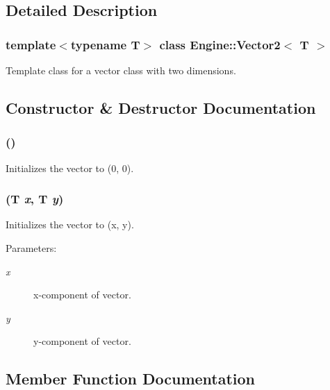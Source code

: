\subsection{Detailed Description}
\subsubsection*{template$<$typename T$>$ class Engine::Vector2$<$ T $>$}

Template class for a vector class with two dimensions. 

\subsection{Constructor \& Destructor Documentation}
\subsubsection{ ()\hspace{0.3cm}{\tt  [inline]}}\label{classEngine_1_1Vector2_3a5df4502ce081e8b80838fe2c15628d}


Initializes the vector to (0, 0). 
\subsubsection{ (T {\em x}, T {\em y})\hspace{0.3cm}{\tt  [inline]}}\label{classEngine_1_1Vector2_a3b21a7a1f62fd8d59fb76da2397ac79}


Initializes the vector to (x, y). \begin{Desc}
\item[Parameters:]
\begin{description}
\item[{\em x}]x-component of vector. \item[{\em y}]y-component of vector. \end{description}
\end{Desc}


\subsection{Member Function Documentation}
